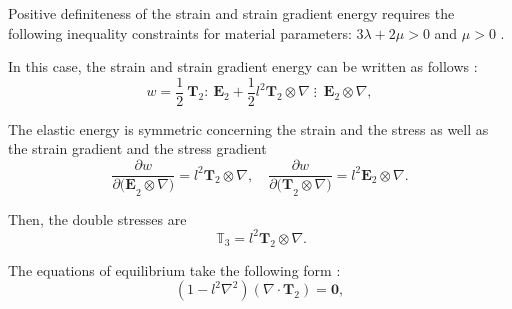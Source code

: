 Positive definiteness of the strain and strain gradient energy requires the following inequality constraints for material parameters: $3\lambda+2\mu>0$ and $\mu>0$  \cite{Chirkov3, Chirkov46}.                                 

In this case, the strain and strain gradient energy can be written as follows \cite{Chirkov46}:
\begin{equation} \label{Chirkov_Eq_11_} 
	w=\frac{1}{2}{\ {\mathbf T}}_2:{\ {\mathbf E}}_2+\frac{1}{2}l^2{{\mathbf T}}_2\otimes \nabla \;\vdots\; {\ {\mathbf E}}_2\otimes \nabla,                                   
\end{equation} 

The elastic energy is symmetric concerning the strain and the stress as well as the strain gradient and the stress gradient
\begin{equation} \label{Chirkov_Eq_12_} 
	\frac{\partial w}{\partial {({\mathbf E}}_2\otimes \nabla {\mathbf )}}=l^2{{\mathbf T}}_2\otimes \nabla ,\quad \frac{\partial w}{\partial {({\mathbf T}}_2\otimes \nabla {\mathbf )}}=l^2{{\mathbf E}}_2\otimes \nabla . 
\end{equation} 

Then, the double stresses are
\begin{equation} \label{Chirkov_Eq_13_} 
	{~{\mathbb T}}_3=l^2{{\mathbf T}}_2\otimes \nabla .                                                           
\end{equation} 

The equations of equilibrium take the following form \cite{Chirkov13}:
\begin{equation} \label{Chirkov_Eq_14_} 
	\left(1-l^2{\nabla }^2\right)( \nabla \cdot {\mathbf T}_2)={\mathbf 0},                                                    
\end{equation} 

